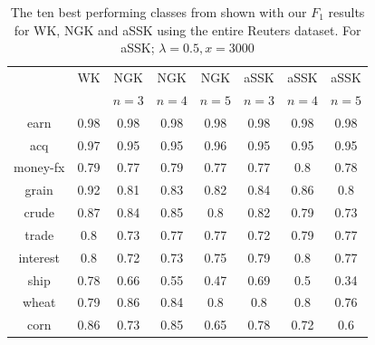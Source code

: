 \begin{table}
	\centering	
	\begin{tabular}{| c | c | c | c | c | c | c | c |}\hline
		& WK & NGK & NGK  & NGK  & aSSK & aSSK& aSSK \\ 
		&  & $n = 3$& $ n = 4 $ & $ n = 5 $ & $ n = 3 $& $ n = 4 $ & $ n = 5 $ \\ \hline
		earn & 0.98 & 0.98 &  0.98&  0.98 & 0.98 & 0.98 & 0.98 \\ \hline
		acq & 0.97 & 0.95 &  0.95 &  0.96 & 0.95 & 0.95 & 0.95 \\ \hline
		money-fx & 0.79 & 0.77 &  0.79 & 0.77 & 0.77 & 0.8 & 0.78 \\ \hline
		grain & 0.92 & 0.81 &  0.83& 0.82 & 0.84 & 0.86 & 0.8 \\ \hline
		crude & 0.87 & 0.84 &  0.85 & 0.8 & 0.82 & 0.79 & 0.73 \\ \hline
		trade & 0.8 & 0.73 &  0.77 & 0.77 & 0.72 & 0.79 & 0.77 \\ \hline
		interest & 0.8 & 0.72 &  0.73 & 0.75 & 0.79 & 0.8 & 0.77 \\ \hline
		ship & 0.78 & 0.66 &  0.55 & 0.47 & 0.69 & 0.5 & 0.34 \\ \hline
		wheat & 0.79 & 0.86 &  0.84 & 0.8 & 0.8 & 0.8 & 0.76 \\ \hline
		corn & 0.86 & 0.73 &  0.85 & 0.65 & 0.78 & 0.72 & 0.6 \\ \hline	
	\end{tabular}
\caption{The ten best performing classes from \cite{lodhi} shown with our $ F_1 $ results for WK, NGK and  aSSK using the entire Reuters dataset. For aSSK; $ \lambda = 0.5, x = 3000$\label{tab:full_data} }
\end{table}

